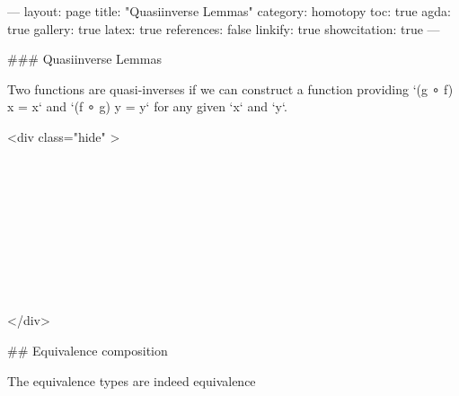 ---
layout: page
title: "Quasiinverse Lemmas"
category: homotopy
toc: true
agda: true
gallery: true
latex: true
references: false
linkify: true
showcitation: true
---

### Quasiinverse Lemmas

Two functions are quasi-inverses if we can construct a function providing
`(g ∘ f) x = x` and `(f ∘ g) y = y` for any given `x` and `y`.

<div class="hide" >
\begin{code}%
\>[0]\AgdaSymbol{\{-\#}\AgdaSpace{}%
\AgdaSpace{}%
\AgdaSpace{}%
\AgdaSymbol{\#-\}}\<%
\\
\>[0]\AgdaSpace{}%
\AgdaSpace{}%
\<%
\\
\>[0]\AgdaSpace{}%
\AgdaSpace{}%
\<%
\\
%
\\[\AgdaEmptyExtraSkip]%
\>[0]\AgdaSpace{}%
\AgdaSpace{}%
\<%
\\
\>[0]\AgdaSpace{}%
\AgdaSpace{}%
\<%
\\
%
\\[\AgdaEmptyExtraSkip]%
%
\\[\AgdaEmptyExtraSkip]%
\>[0]\AgdaSpace{}%
\AgdaSpace{}%
\<%
\end{code}
</div>

## Equivalence composition

\begin{code}%
\>[0]\AgdaSpace{}%
\AgdaSpace{}%
\<%
\end{code}

The equivalence types are indeed equivalence

